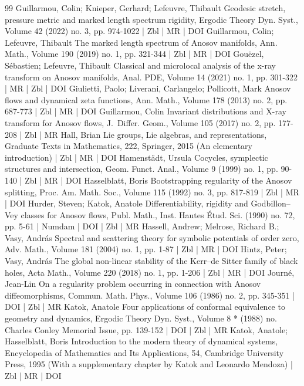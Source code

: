 \documentclass[10pt]{amsart}
\theoremstyle{definition}\newtheorem{defi}[theo]{Definition}\newtheorem{rema}[theo]{Remark}\newtheorem{exam}[theo]{Example}\newtheorem{exem}[theo]{Example}\newtheorem{nota}[theo]{Notation}
\begin{document}
\begin{thebibliography}{99}
Guillarmou, Colin; Knieper, Gerhard; Lefeuvre, Thibault Geodesic stretch, pressure metric and marked length spectrum rigidity, Ergodic Theory Dyn. Syst., Volume 42 (2022) no. 3, pp. 974-1022 | Zbl | MR | DOI
Guillarmou, Colin; Lefeuvre, Thibault The marked length spectrum of Anosov manifolds, Ann. Math., Volume 190 (2019) no. 1, pp. 321-344 | Zbl | MR | DOI
Gouëzel, Sébastien; Lefeuvre, Thibault Classical and microlocal analysis of the x-ray transform on Anosov manifolds, Anal. PDE, Volume 14 (2021) no. 1, pp. 301-322 | MR | Zbl | DOI
Giulietti, Paolo; Liverani, Carlangelo; Pollicott, Mark Anosov flows and dynamical zeta functions, Ann. Math., Volume 178 (2013) no. 2, pp. 687-773 | Zbl | MR | DOI
Guillarmou, Colin Invariant distributions and X-ray transform for Anosov flows, J. Differ. Geom., Volume 105 (2017) no. 2, pp. 177-208 | Zbl | MR
Hall, Brian Lie groups, Lie algebras, and representations, Graduate Texts in Mathematics, 222, Springer, 2015 (An elementary introduction) | Zbl | MR | DOI
Hamenstädt, Ursula Cocycles, symplectic structures and intersection, Geom. Funct. Anal., Volume 9 (1999) no. 1, pp. 90-140 | Zbl | MR | DOI
Hasselblatt, Boris Bootstrapping regularity of the Anosov splitting, Proc. Am. Math. Soc., Volume 115 (1992) no. 3, pp. 817-819 | Zbl | MR | DOI
Hurder, Steven; Katok, Anatole Differentiability, rigidity and Godbillon–Vey classes for Anosov flows, Publ. Math., Inst. Hautes Étud. Sci. (1990) no. 72, pp. 5-61 | Numdam | DOI | Zbl | MR
Hassell, Andrew; Melrose, Richard B.; Vasy, András Spectral and scattering theory for symbolic potentials of order zero, Adv. Math., Volume 181 (2004) no. 1, pp. 1-87 | Zbl | MR | DOI
Hintz, Peter; Vasy, András The global non-linear stability of the Kerr–de Sitter family of black holes, Acta Math., Volume 220 (2018) no. 1, pp. 1-206 | Zbl | MR | DOI
Journé, Jean-Lin On a regularity problem occurring in connection with Anosov diffeomorphisms, Commun. Math. Phys., Volume 106 (1986) no. 2, pp. 345-351 | DOI | Zbl | MR
Katok, Anatole Four applications of conformal equivalence to geometry and dynamics, Ergodic Theory Dyn. Syst., Volume 8 * (1988) no. Charles Conley Memorial Issue, pp. 139-152 | DOI | Zbl | MR
Katok, Anatole; Hasselblatt, Boris Introduction to the modern theory of dynamical systems, Encyclopedia of Mathematics and Its Applications, 54, Cambridge University Press, 1995 (With a supplementary chapter by Katok and Leonardo Mendoza) | Zbl | MR | DOI

\end{thebibliography}
\end{document}
